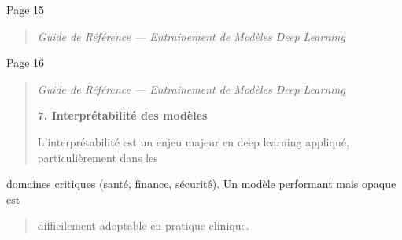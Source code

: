 \documentclass[
]{article}
\begin{document}
Page 15

\begin{quote}
\emph{Guide de Référence --- Entraînement de Modèles Deep Learning}
\end{quote}

Page 16

\begin{quote}
\emph{Guide de Référence --- Entraînement de Modèles Deep Learning}

\textbf{7. Interprétabilité des modèles}

L'interprétabilité est un enjeu majeur en deep learning appliqué,
particulièrement dans les
\end{quote}

domaines critiques (santé, finance, sécurité). Un modèle performant mais
opaque est

\begin{quote}
difficilement adoptable en pratique clinique.
\end{quote}
\end{document}
